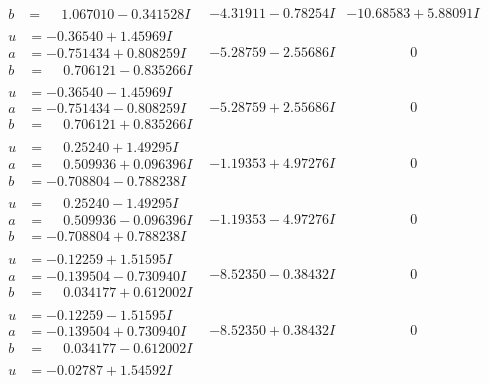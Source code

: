\documentclass[1p]{elsarticle_modified}
\theoremstyle{definition}
\begin{document}
$$\begin{array}{c|c|c}
\begin{aligned}
b &= \phantom{-}1.067010 - 0.341528 I\end{aligned}
 & -4.31911 - 0.78254 I & -10.68583 + 5.88091 I \\ \hline\begin{aligned}
u &= -0.36540 + 1.45969 I \\
a &= -0.751434 + 0.808259 I \\
b &= \phantom{-}0.706121 - 0.835266 I\end{aligned}
 & -5.28759 - 2.55686 I & \phantom{-0.000000 } 0 \\ \hline\begin{aligned}
u &= -0.36540 - 1.45969 I \\
a &= -0.751434 - 0.808259 I \\
b &= \phantom{-}0.706121 + 0.835266 I\end{aligned}
 & -5.28759 + 2.55686 I & \phantom{-0.000000 } 0 \\ \hline\begin{aligned}
u &= \phantom{-}0.25240 + 1.49295 I \\
a &= \phantom{-}0.509936 + 0.096396 I \\
b &= -0.708804 - 0.788238 I\end{aligned}
 & -1.19353 + 4.97276 I & \phantom{-0.000000 } 0 \\ \hline\begin{aligned}
u &= \phantom{-}0.25240 - 1.49295 I \\
a &= \phantom{-}0.509936 - 0.096396 I \\
b &= -0.708804 + 0.788238 I\end{aligned}
 & -1.19353 - 4.97276 I & \phantom{-0.000000 } 0 \\ \hline\begin{aligned}
u &= -0.12259 + 1.51595 I \\
a &= -0.139504 - 0.730940 I \\
b &= \phantom{-}0.034177 + 0.612002 I\end{aligned}
 & -8.52350 - 0.38432 I & \phantom{-0.000000 } 0 \\ \hline\begin{aligned}
u &= -0.12259 - 1.51595 I \\
a &= -0.139504 + 0.730940 I \\
b &= \phantom{-}0.034177 - 0.612002 I\end{aligned}
 & -8.52350 + 0.38432 I & \phantom{-0.000000 } 0 \\ \hline\begin{aligned}
u &= -0.02787 + 1.54592 I \\

\end{aligned}
\end{array}$$
\end{document}
